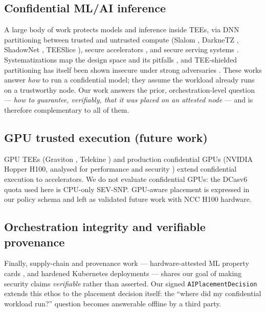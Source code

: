 \subsection{Confidential ML/AI inference}
A large body of work protects models and inference inside TEEs, via DNN
partitioning between trusted and untrusted compute (Slalom \cite{tramer2019slalom},
DarkneTZ \cite{mo2020darknetz}, ShadowNet \cite{sun2020shadownet},
TEESlice \cite{li2024teeslice}), secure accelerators
\cite{hua2020guardnn,hashemi2022darknight}, and secure serving systems
\cite{ma2020s3ml,lee2020ppml,hu2024sesemi,schambach2026enclavex,yu2025dualprivacy,abdollahi2025ondevice,abdollahi2026agentee}.
Systematizations map the design space and its pitfalls
\cite{mo2022mlccsok,duy2021cmlsok}, and TEE-shielded partitioning has itself been
shown insecure under strong adversaries \cite{zhang2023noprivacy}. These works
answer \emph{how} to run a confidential model; they assume the workload already
runs on a trustworthy node. Our work answers the prior, orchestration-level
question --- \emph{how to guarantee, verifiably, that it was placed on an
attested node} --- and is therefore complementary to all of them.

\subsection{GPU trusted execution (future work)}
GPU TEEs (Graviton \cite{volos2018graviton}, Telekine \cite{hunt2020telekine})
and production confidential GPUs (NVIDIA Hopper H100, analysed for performance
\cite{zhu2024h100bench} and security \cite{gu2025gpucc}) extend confidential
execution to accelerators. We do not evaluate confidential GPUs: the DCasv6
quota used here is CPU-only SEV-SNP. GPU-aware placement is expressed in our
policy schema and left as validated future work with NCC H100 hardware.

\subsection{Orchestration integrity and verifiable provenance}
Finally, supply-chain and provenance work --- hardware-attested ML property
cards \cite{duddu2024laminator}, and hardened Kubernetes deployments
\cite{ali2024cmsweb,enyedi2026modrepos} --- shares our goal of making
security claims \emph{verifiable} rather than asserted. Our signed
\texttt{AIPlacementDecision} extends this ethos to the placement decision itself:
the ``where did my confidential workload run?'' question becomes answerable
offline by a third party.

